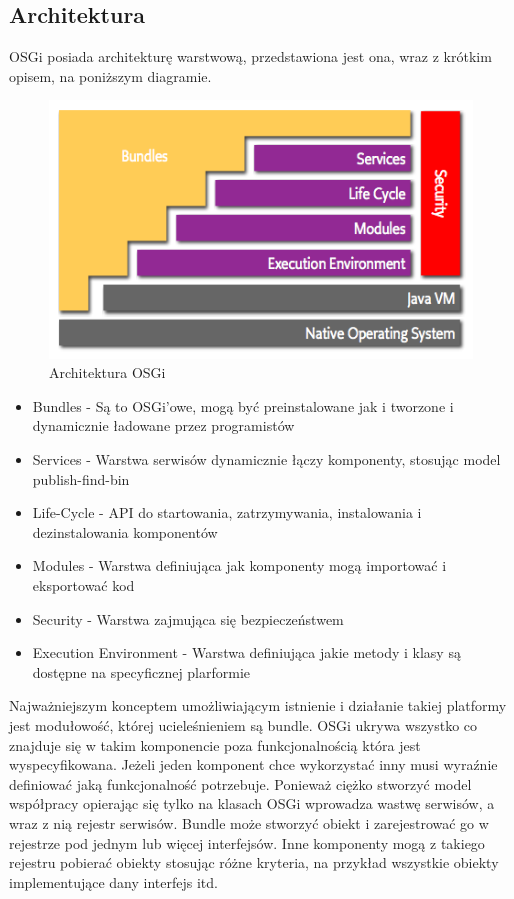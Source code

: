 \subsection{Architektura}
OSGi posiada architekturę warstwową, przedstawiona jest ona, wraz z krótkim opisem, na poniższym diagramie.
\begin{figure}[!h]
	\centering
	\includegraphics[scale=0.75]{osgiArchitektura.png} 
	\caption{Architektura OSGi}
\end{figure}
\begin{itemize}
	\item Bundles - Są to OSGi'owe, mogą być preinstalowane jak i tworzone i dynamicznie ładowane przez programistów
	\item Services - Warstwa serwisów dynamicznie łączy komponenty, stosując model publish-find-bin
	\item Life-Cycle - API do startowania, zatrzymywania, instalowania i dezinstalowania komponentów
	\item Modules - Warstwa definiująca jak komponenty mogą importować i eksportować kod	
	\item Security - Warstwa zajmująca się bezpieczeństwem
	\item Execution Environment - Warstwa definiująca jakie metody i klasy są dostępne na specyficznej plarformie
\end{itemize}  
Najważniejszym konceptem umożliwiającym istnienie i działanie takiej platformy jest modułowość, której ucieleśnieniem są bundle. OSGi ukrywa wszystko co znajduje się w takim komponencie poza funkcjonalnością która jest wyspecyfikowana. Jeżeli jeden komponent chce wykorzystać inny musi wyraźnie definiować jaką funkcjonalność potrzebuje. Ponieważ ciężko stworzyć model współpracy opierając się tylko na klasach OSGi wprowadza wastwę serwisów, a wraz z nią rejestr serwisów. Bundle może stworzyć obiekt i zarejestrować go w rejestrze pod jednym lub więcej interfejsów. Inne komponenty mogą z takiego rejestru pobierać obiekty stosując różne kryteria, na przykład wszystkie obiekty implementujące dany interfejs itd.
